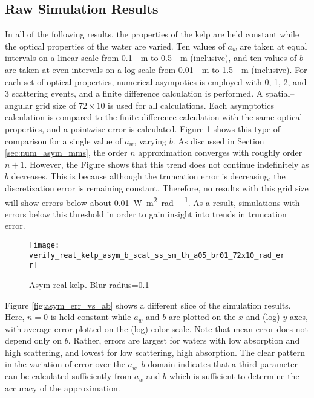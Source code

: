 \subsection{Raw Simulation Results}
\label{sec:iop_study_raw}
In all of the following results, the properties of the kelp are held constant while the optical properties of the water are varied.
Ten values of $a_w$ are taken at equal intervals on a linear scale from \SI{0.1}{\per\m} to \SI{0.5}{\per\m} (inclusive), and ten values of $b$ are taken at even intervals on a log scale from \SI{0.01}{\per\m} to \SI{1.5}{\per\m} (inclusive).
For each set of optical properties, numerical asympotics is employed with 0, 1, 2, and 3 scattering events, and a finite difference calculation is performed.
A spatial--angular grid size of $72 \times 10$ is used for all calculations.
Each asymptotics calculation is compared to the finite difference calculation with the same optical properties, and a pointwise error is calculated.
Figure \ref{fig:asym_real_kelp_br01} shows this type of comparison for a single value of $a_w$, varying $b$.
As discussed in Section \ref{sec:num_asym_mms}, the order $n$ approximation converges with roughly order $n+1$.
However, the Figure shows that this trend does not continue indefinitely as $b$ decreases.
This is because although the truncation error is decreasing, the discretization error is remaining constant.
Therefore, no results with this grid size will show errors below about \SI{0.01}{\W\per\m\squared\per\radian}.
As a result, simulations with errors below this threshold in order to gain insight into trends in truncation error.

\newcommand\rdfigwidth{4.5in}

\begin{figure}[H]
  \centering
  \texttt{[image: verify\_real\_kelp\_asym\_b\_scat\_ss\_sm\_th\_a05\_br01\_72x10\_rad\_err]}
  \caption{Asym real kelp. Blur radius=0.1}
  \label{fig:asym_real_kelp_br01}
\end{figure}

Figure \ref{fig:asym_err_vs_ab} shows a different slice of the simulation results.
Here, $n=0$ is held constant while $a_w$ and $b$ are plotted on the $x$ and (log) $y$ axes, with average error plotted on the (log) color scale.
Note that mean error does not depend only on $b$.
Rather, errors are largest for waters with low absorption and high scattering, and lowest for low scattering, high absorption.
The clear pattern in the variation of error over the $a_w$--$b$ domain indicates that a third parameter can be calculated sufficiently from $a_w$ and $b$ which is sufficient to determine the accuracy of the approximation.

